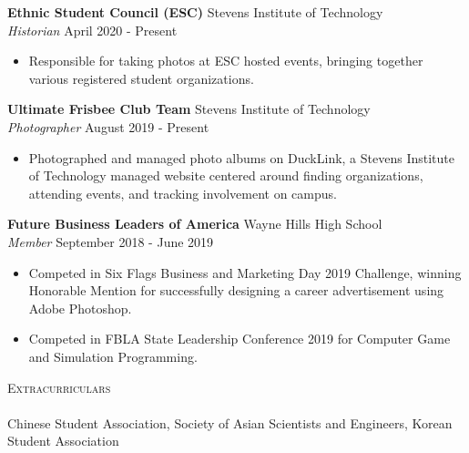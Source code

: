 \documentclass[10pt]{article}
\newcommand{\lineunder} {
    \vspace*{-8pt} \\
    \hspace*{-18pt} \hrulefill \\
}
\newcommand{\header} [1] {
    {\hspace*{-18pt}\vspace*{6pt} \textsc{#1}}
    \vspace*{-6pt} \lineunder
}
\begin{document}
\textbf{Ethnic Student Council (ESC)} \hfill Stevens Institute of Technology\\
\textit{Historian} \hfill April 2020 - Present\\
\vspace{-1mm}
\begin{itemize} \itemsep 1pt
	\item Responsible for taking photos at ESC hosted events, bringing together various registered student organizations.
\end{itemize}

\textbf{Ultimate Frisbee Club Team} \hfill Stevens Institute of Technology\\
\textit{Photographer} \hfill August 2019 - Present\\
\vspace{-1mm}
\begin{itemize} \itemsep 1pt
	\item Photographed and managed photo albums on DuckLink, a Stevens Institute of Technology managed website centered around finding organizations, attending events, and tracking involvement on campus.
\end{itemize}

\textbf{Future Business Leaders of America} \hfill Wayne Hills High School\\
\textit{Member} \hfill September 2018 - June 2019\\
\vspace{-1mm}
\begin{itemize}  \itemsep 1pt
	\item Competed in Six Flags Business and Marketing Day 2019 Challenge, winning Honorable Mention for successfully designing a career advertisement using Adobe Photoshop.
	\item Competed in FBLA State Leadership Conference 2019 for Computer Game and Simulation Programming.
\end{itemize}

\header{Extracurriculars}
Chinese Student Association, Society of Asian Scientists and Engineers, Korean Student Association
\end{document}
